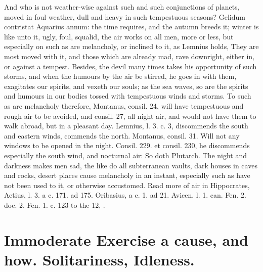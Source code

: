 {And who is not weather-wise against such and such conjunctions of
planets, moved in foul weather, dull and heavy in such tempestuous
seasons?  Gelidum contristat Aquarius annum: the time requires,
and the autumn breeds it; winter is like unto it, ugly, foul, squalid,
the air works on all men, more or less, but especially on such as are
melancholy, or inclined to it, as Lemnius holds, They are most
moved with it, and those which are already mad, rave downright, either
in, or against a tempest. Besides, the devil many times takes his
opportunity of such storms, and when the humours by the air be stirred,
he goes in with them, exagitates our spirits, and vexeth our souls; as
the sea waves, so are the spirits and humours in our bodies tossed with
tempestuous winds and storms. To such as are melancholy therefore,
Montanus, consil. 24, will have tempestuous and rough air to be
avoided, and consil. 27, all night air, and would not have them to walk
abroad, but in a pleasant day. Lemnius, l. 3. c. 3, discommends the
south and eastern winds, commends the north. Montanus, consil. 31.
Will not any windows to be opened in the night. Consil. 229. et
consil. 230, he discommends especially the south wind, and nocturnal
air: So doth Plutarch. The night and darkness makes men sad, the
like do all subterranean vaults, dark houses in caves and rocks, desert
places cause melancholy in an instant, especially such as have not been
used to it, or otherwise accustomed. Read more of air in Hippocrates,
Aetius, l. 3. a c. 171. ad 175. Oribasius, a c. 1. ad 21. Avicen. l. 1.
can. Fen. 2. doc. 2. Fen. 1. c. 123 to the 12, \etc{}.

\section[Immoderate Exercise, Idleness]{Immoderate Exercise a cause, and how. Solitariness, Idleness.}

}
